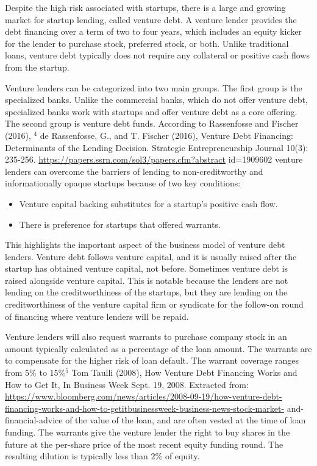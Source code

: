\documentclass[11pt]{article}
\begin{document}
Despite the high risk associated with startups, there is a large and growing market for startup lending, called venture debt. A venture lender provides the debt financing over a term of two to four years, which includes an equity kicker for the lender to purchase stock, preferred stock, or both. Unlike traditional loans, venture debt typically does not require any collateral or positive cash flows from the startup.

Venture lenders can be categorized into two main groups. The first group is the specialized banks. Unlike the commercial banks, which do not offer venture debt, specialized banks work with startups and offer venture debt as a core offering. The second group is venture debt funds. According to Rassenfosse and Fischer (2016), ${ }^{4}$ de Rassenfosse, G., and T. Fischer (2016), Venture Debt Financing: Determinants of the Lending Decision. Strategic Entrepreneurship Journal 10(3): 235-256. \href{https://papers.ssrn.com/sol3/papers.cfm?abstract}{https://papers.ssrn.com/sol3/papers.cfm?abstract} id=1909602 venture lenders can overcome the barriers of lending to non-creditworthy and informationally opaque startups because of two key conditions:

\begin{itemize}
  \item Venture capital backing substitutes for a startup's positive cash flow.
  \item There is preference for startups that offered warrants.
\end{itemize}

This highlights the important aspect of the business model of venture debt lenders. Venture debt follows venture capital, and it is usually raised after the startup has obtained venture capital, not before. Sometimes venture debt is raised alongside venture capital. This is notable because the lenders are not lending on the creditworthiness of the startups, but they are lending on the creditworthiness of the venture capital firm or syndicate for the follow-on round of financing where venture lenders will be repaid.

Venture lenders will also request warrants to purchase company stock in an amount typically calculated as a percentage of the loan amount. The warrants are to compensate for the higher risk of loan default. The warrant coverage ranges from $5 \%$ to $15 \%{ }^{5}$ Tom Taulli (2008), How Venture Debt Financing Works and How to Get It, In Business Week Sept. 19, 2008. Extracted from: \href{https://www.bloomberg.com/news/articles/2008-09-19/how-venture-debt-financing-works-and-how-to-getitbusinessweek-business-news-stock-market-}{https://www.bloomberg.com/news/articles/2008-09-19/how-venture-debt-financing-works-and-how-to-getitbusinessweek-business-news-stock-market-} and-financial-advice of the value of the loan, and are often vested at the time of loan funding. The warrants give the venture lender the right to buy shares in the future at the per-share price of the most recent equity funding round. The resulting dilution is typically less than $2 \%$ of equity.
\end{document}
